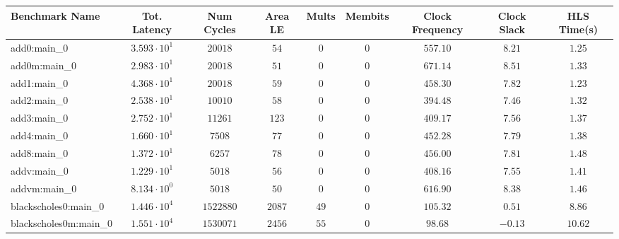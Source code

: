 \begin{tabular}{|l|c|c|c|c|c|c|c|c|}
\hline
Benchmark Name                 & Tot. Latency           & Num Cycles   & Area LE    & Mults    & Membits      & Clock Frequency & Clock Slack & HLS Time(s) \\
\hline
add0:main\_0                   & $ 3.593 \cdot 10^{1} $ & $ 20018    $ & $ 54     $ & $ 0    $ & $ 0        $ & $ 557.10      $ & $ 8.21    $ & $ 1.25    $ \\
add0m:main\_0                  & $ 2.983 \cdot 10^{1} $ & $ 20018    $ & $ 51     $ & $ 0    $ & $ 0        $ & $ 671.14      $ & $ 8.51    $ & $ 1.33    $ \\
add1:main\_0                   & $ 4.368 \cdot 10^{1} $ & $ 20018    $ & $ 59     $ & $ 0    $ & $ 0        $ & $ 458.30      $ & $ 7.82    $ & $ 1.23    $ \\
add2:main\_0                   & $ 2.538 \cdot 10^{1} $ & $ 10010    $ & $ 58     $ & $ 0    $ & $ 0        $ & $ 394.48      $ & $ 7.46    $ & $ 1.32    $ \\
add3:main\_0                   & $ 2.752 \cdot 10^{1} $ & $ 11261    $ & $ 123    $ & $ 0    $ & $ 0        $ & $ 409.17      $ & $ 7.56    $ & $ 1.37    $ \\
add4:main\_0                   & $ 1.660 \cdot 10^{1} $ & $ 7508     $ & $ 77     $ & $ 0    $ & $ 0        $ & $ 452.28      $ & $ 7.79    $ & $ 1.38    $ \\
add8:main\_0                   & $ 1.372 \cdot 10^{1} $ & $ 6257     $ & $ 78     $ & $ 0    $ & $ 0        $ & $ 456.00      $ & $ 7.81    $ & $ 1.48    $ \\
addv:main\_0                   & $ 1.229 \cdot 10^{1} $ & $ 5018     $ & $ 56     $ & $ 0    $ & $ 0        $ & $ 408.16      $ & $ 7.55    $ & $ 1.41    $ \\
addvm:main\_0                  & $ 8.134 \cdot 10^{0} $ & $ 5018     $ & $ 50     $ & $ 0    $ & $ 0        $ & $ 616.90      $ & $ 8.38    $ & $ 1.46    $ \\
blackscholes0:main\_0          & $ 1.446 \cdot 10^{4} $ & $ 1522880  $ & $ 2087   $ & $ 49   $ & $ 0        $ & $ 105.32      $ & $ 0.51    $ & $ 8.86    $ \\
blackscholes0m:main\_0         & $ 1.551 \cdot 10^{4} $ & $ 1530071  $ & $ 2456   $ & $ 55   $ & $ 0        $ & $ 98.68       $ & $ -0.13   $ & $ 10.62   $ \\

\end{tabular}
